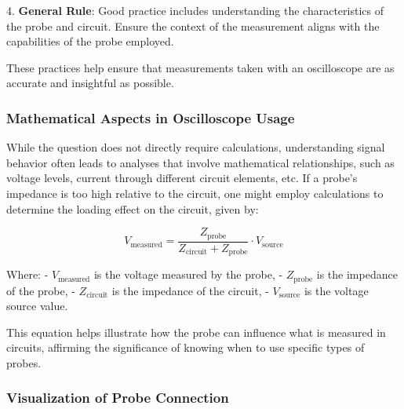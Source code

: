 4. \textbf{General Rule}: Good practice includes understanding the characteristics of the probe and circuit. Ensure the context of the measurement aligns with the capabilities of the probe employed.

These practices help ensure that measurements taken with an oscilloscope are as accurate and insightful as possible.

\subsubsection{Mathematical Aspects in Oscilloscope Usage}

While the question does not directly require calculations, understanding signal behavior often leads to analyses that involve mathematical relationships, such as voltage levels, current through different circuit elements, etc. If a probe’s impedance is too high relative to the circuit, one might employ calculations to determine the loading effect on the circuit, given by:

\[
V_{\text{measured}} = \frac{Z_{\text{probe}}}{Z_{\text{circuit}} + Z_{\text{probe}}} \cdot V_{\text{source}}
\]

Where:
- \(V_{\text{measured}}\) is the voltage measured by the probe,
- \(Z_{\text{probe}}\) is the impedance of the probe,
- \(Z_{\text{circuit}}\) is the impedance of the circuit,
- \(V_{\text{source}}\) is the voltage source value.

This equation helps illustrate how the probe can influence what is measured in circuits, affirming the significance of knowing when to use specific types of probes.

\subsubsection{Visualization of Probe Connection}

\begin{center}
\end{center}
